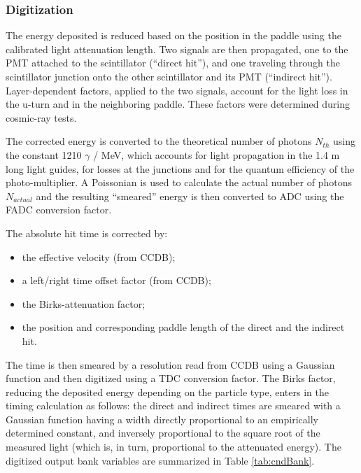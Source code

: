 \subsubsection{Digitization}

The energy deposited is reduced based on the position in the paddle using the calibrated light attenuation length.
Two signals are then propagated, one to the PMT attached to the scintillator (``direct hit''), and one traveling
through the scintillator junction onto the other scintillator and its PMT (``indirect hit'').
Layer-dependent factors, applied to the two  signals, account for the light loss in the u-turn and in the neighboring paddle.
These factors were determined during cosmic-ray tests.

The corrected energy is converted to the theoretical number of photons $N_{th}$ using the constant 1210 $\gamma$ / MeV,
which accounts for light propagation in the 1.4 m long light guides, for losses at the junctions and for the
quantum efficiency of the photo-multiplier.
A Poissonian is used to calculate the actual number of photons $N_{actual}$ and the resulting ``smeared'' energy
is then converted to ADC using the FADC conversion factor.

The absolute hit time is corrected by:

\begin{itemize}
	\item the effective velocity (from CCDB);
	\item a left/right time offset factor (from CCDB);
	\item the Birks-attenuation factor;
	\item the position and corresponding paddle length of the direct and the indirect hit.
\end{itemize}

The time is then smeared by a resolution read from CCDB using a Gaussian function and then digitized using a TDC conversion factor.
The Birks factor, reducing the deposited
energy depending on the particle type, enters in the timing calculation as
follows: the direct and indirect times are smeared with a Gaussian
function having a width directly proportional to an empirically determined
constant, and inversely proportional to the square root of the measured
light (which is, in turn, proportional to the attenuated energy).
The digitized output bank variables are summarized in Table \ref{tab:cndBank}.

